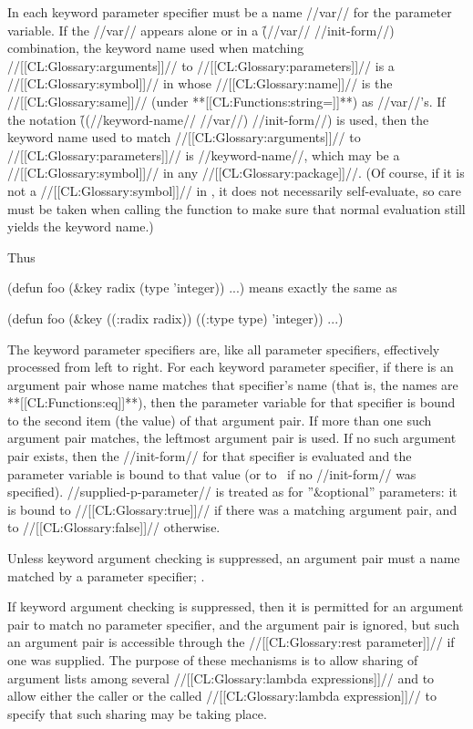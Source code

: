 In each keyword parameter specifier must be a name //var// for
the parameter variable.
If the //var// appears alone or in a \f{(//var// //init-form//)}
combination, the keyword name used when matching //[[CL:Glossary:arguments]]// to //[[CL:Glossary:parameters]]//
is a //[[CL:Glossary:symbol]]// in  whose //[[CL:Glossary:name]]// is the
//[[CL:Glossary:same]]// (under **[[CL:Functions:string=]]**) as //var//'s.
If the notation \f{((//keyword-name// //var//) //init-form//)} is used,
then the keyword name used to match //[[CL:Glossary:arguments]]// to //[[CL:Glossary:parameters]]// is
//keyword-name//, which may be a //[[CL:Glossary:symbol]]// in any //[[CL:Glossary:package]]//.
(Of course, if it is not a //[[CL:Glossary:symbol]]// in ,
it does not necessarily self-evaluate, so care must be taken when calling the function
to make sure that normal evaluation still yields the keyword name.)

Thus

\code
 (defun foo (&key radix (type 'integer)) ...)
\endcode
means exactly the same as

\code
 (defun foo (&key ((:radix radix)) ((:type type) 'integer)) ...)
\endcode

The keyword parameter specifiers are, like all parameter specifiers,
effectively processed from left to right.  For each keyword parameter
specifier, if there is an argument pair whose name matches that
specifier's name (that is, the names are **[[CL:Functions:eq]]**), then the
parameter variable for that specifier is bound to the second item (the
value) of that argument pair.  If more than one such argument pair
matches, the leftmost argument pair is used.  If no such argument pair
exists, then the //init-form// for that specifier is evaluated and
the parameter variable is bound to that value (or to \nil\ if no
//init-form// was specified).  //supplied-p-parameter// is
treated as for ''&optional'' parameters: it is bound to //[[CL:Glossary:true]]// if there
was a matching argument pair, and to //[[CL:Glossary:false]]// otherwise.


Unless keyword argument checking is suppressed,
an argument pair must a name matched by a parameter specifier;
\seesection\UnrecognizedKeyArgs.





If keyword argument checking is suppressed, 
then it is permitted for an argument pair
to match no parameter specifier, and the argument pair is ignored, but
such an argument pair is accessible through the //[[CL:Glossary:rest parameter]]// if
one was supplied.  The purpose of these mechanisms is to allow sharing
of argument lists among several //[[CL:Glossary:lambda expressions]]// and to
allow either the caller or the called //[[CL:Glossary:lambda expression]]// to
specify that such sharing may be taking place.

